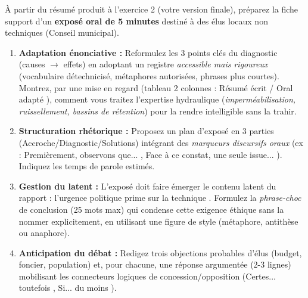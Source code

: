 \documentclass[11pt]{article}
\begin{document}
\begin{exercice}
À partir du résumé produit à l'exercice 2 (votre version finale), préparez la fiche support d'un \textbf{exposé oral de 5 minutes} destiné à des élus locaux non techniques (Conseil municipal).
\begin{enumerate}
    \item \textbf{Adaptation énonciative :} Reformulez les 3 points clés du diagnostic (causes $\rightarrow$ effets) en adoptant un registre \textit{accessible mais rigoureux} (vocabulaire détechnicisé, métaphores autorisées, phrases plus courtes). Montrez, par une mise en regard (tableau 2 colonnes : \og Résumé écrit \fg{} / \og Oral adapté \fg{}), comment vous traitez l'expertise hydraulique (\textit{imperméabilisation, ruissellement, bassins de rétention}) pour la rendre intelligible sans la trahir.
    \item \textbf{Structuration rhétorique :} Proposez un plan d'exposé en 3 parties (Accroche/Diagnostic/Solutions) intégrant des \textit{marqueurs discursifs oraux} (ex : \og Premièrement, observons que... \fg{}, \og Face à ce constat, une seule issue... \fg{}). Indiquez les temps de parole estimés.
    \item \textbf{Gestion du latent :} L'exposé doit faire émerger le contenu latent du rapport : \og l'urgence politique prime sur la technique \fg{}. Formulez la \textit{phrase-choc} de conclusion (25 mots max) qui condense cette exigence éthique sans la nommer explicitement, en utilisant une figure de style (métaphore, antithèse ou anaphore).
    \item \textbf{Anticipation du débat :} Redigez trois objections probables d'élus (budget, foncier, population) et, pour chacune, une réponse argumentée (2-3 lignes) mobilisant les connecteurs logiques de concession/opposition (\og Certes... toutefois \fg{}, \og Si... du moins \fg{}).
\end{enumerate}
\end{exercice}
\end{document}
